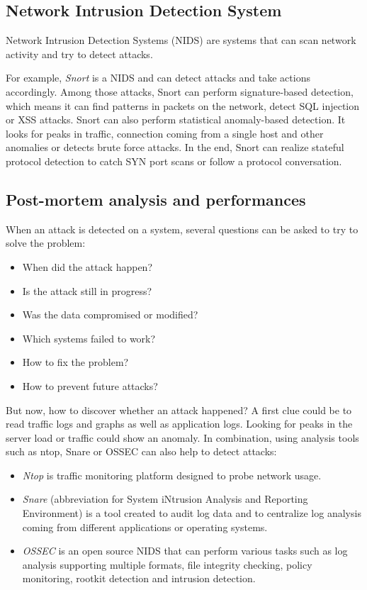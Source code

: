\subsection{Network Intrusion Detection System}

Network Intrusion Detection Systems (NIDS) are systems that can scan network
activity and try to detect attacks.

For example, \textit{Snort} is a NIDS and can detect attacks
and take actions accordingly. Among those attacks, Snort can perform
signature-based detection, which means it can find patterns in packets on the
network, detect SQL injection or XSS attacks. Snort can also perform
statistical anomaly-based detection. It looks for peaks in traffic, connection
coming from a single host and other anomalies or detects brute force attacks.
In the end, Snort can realize stateful protocol detection to catch SYN port
scans or follow a protocol conversation.

\subsection{Post-mortem analysis and performances}

When an attack is detected on a system, several questions can be asked to try
to solve the problem:
\begin{itemize}
\item When did the attack happen?
\item Is the attack still in progress?
\item Was the data compromised or modified?
\item Which systems failed to work?
\item How to fix the problem?
\item How to prevent future attacks?
\end{itemize}

But now, how to discover whether an attack happened? A first clue could be to read
traffic logs and graphs as well as application logs. Looking for peaks in the
server load or traffic could show an anomaly.
In combination, using analysis tools such as ntop, Snare or OSSEC can also help
to detect attacks:
\begin{itemize}
\item \textit{Ntop} is traffic monitoring platform designed to probe network usage.
\item \textit{Snare} (abbreviation for System iNtrusion Analysis and Reporting
	Environment) is a tool created to audit log data and to centralize log
	analysis coming from different applications or operating systems.
\item \textit{OSSEC} is an open source NIDS that can perform various tasks such as log
analysis supporting multiple formats, file integrity checking, policy
monitoring, rootkit detection and intrusion detection.
\end{itemize}

